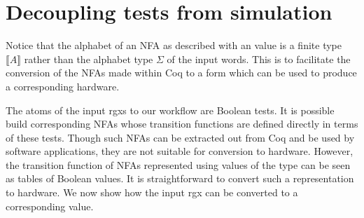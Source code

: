 
\section{Decoupling tests from simulation} \label{sec:c3-ft}
Notice that the alphabet of an \gls{NFA} as described with an
 value is a finite type $⟦A⟧$ rather than the alphabet type
$\Sigma$ of the input words.
This is to facilitate the conversion of the \glspl{NFA} made within Coq
to a form which can be used to produce a corresponding hardware.

The atoms of the input \glspl{rgx} to our workflow are Boolean tests.
It is possible build corresponding \glspl{NFA} whose transition functions
are defined directly in terms of these tests.
Though such \glspl{NFA} can be extracted out from Coq and be used by
software applications, they are not suitable for conversion to
hardware.
%
%
However, the transition function of \glspl{NFA} represented using
values of the  type can be seen as tables of Boolean values.
It is straightforward to convert such a representation to hardware.
We now show how the input \gls{rgx} can be converted to a
corresponding  value.


